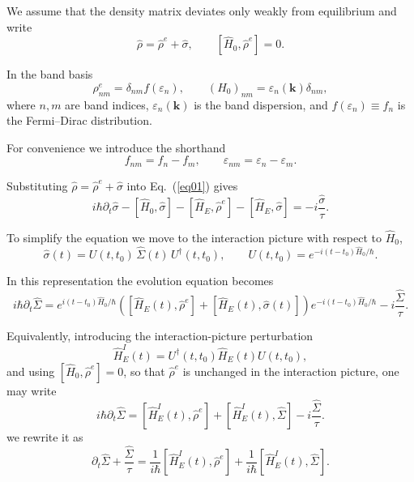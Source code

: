 \documentclass[aps, prb, superscriptaddress, longbibliography]{revtex4-2}
\renewcommand{\epsilon}{\varepsilon}
\numberwithin{equation}{section}
\begin{document}
We assume that the density matrix deviates only weakly from equilibrium and write
\begin{equation}
\hat\rho=\hat\rho^e+\hat\sigma,
\qquad
[\hat H_0,\hat\rho^e]=0 .
\end{equation}

In the band basis
\begin{equation}
\rho^e_{nm}
=
\delta_{nm}f(\epsilon_n),
\qquad
(H_0)_{nm}
=
\epsilon_n(\mathbf k)\delta_{nm},
\end{equation}
where $n,m$ are band indices, $\epsilon_n(\mathbf k)$ is the band dispersion, and
$f(\epsilon_n)\equiv f_n$ is the Fermi–Dirac distribution.

For convenience we introduce the shorthand
\begin{equation}
f_{nm}=f_n-f_m,
\qquad
\epsilon_{nm}=\epsilon_n-\epsilon_m .
\end{equation}

Substituting $\hat\rho=\hat\rho^e+\hat\sigma$ into Eq.~(\ref{eq01}) gives
\begin{equation}
i\hbar\partial_t\hat\sigma
-
[\hat H_0,\hat\sigma]
-
[\hat H_E,\hat\rho^e]
-
[\hat H_E,\hat\sigma]
=
-i\frac{\hat\sigma}{\tau}.
\end{equation}

To simplify the equation we move to the interaction picture with respect to $\hat H_0$,
\begin{equation}
\hat\sigma(t)
=
U(t,t_0)\,\hat\Sigma(t)\,U^\dagger(t,t_0),
\qquad
U(t,t_0)=e^{-i(t-t_0)\hat H_0/\hbar}.
\end{equation}



In this representation the evolution equation becomes
\begin{equation}
i\hbar\partial_t\hat\Sigma
=
e^{i(t-t_0)\hat H_0/\hbar}
\left(
[\hat H_E(t),\hat\rho^e]
+
[\hat H_E(t),\hat\sigma(t)]
\right)
e^{-i(t-t_0)\hat H_0/\hbar}
-i\frac{\hat\Sigma}{\tau}.
\end{equation}

Equivalently, introducing the interaction-picture perturbation
\begin{equation}
\hat H_E^I(t)=U^\dagger(t,t_0)\hat H_E(t)U(t,t_0),
\end{equation}
and using $[\hat H_0,\hat\rho^e]=0$, so that $\hat\rho^e$ is unchanged in the interaction picture, one may write
\begin{equation}
i\hbar\partial_t\hat\Sigma
=
[\hat H_E^I(t),\hat\rho^e]
+
[\hat H_E^I(t),\hat\Sigma]
-i\frac{\hat\Sigma}{\tau}.
\end{equation}
we rewrite it as
\begin{equation}
\partial_t\hat\Sigma+\frac{\hat\Sigma}{\tau}
=
\frac{1}{i\hbar}[\hat H_E^I(t),\hat\rho^e]
+
\frac{1}{i\hbar}[\hat H_E^I(t),\hat\Sigma].
\end{equation}
\end{document}
